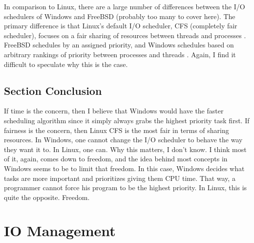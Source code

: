 \documentclass[onecolumn, draftclsnofoot,10pt, compsoc]{IEEEtran}
\begin{document}
\noindent In comparison to Linux, there are a large number of differences between the I/O schedulers of Windows and FreeBSD (probably too many to cover here). The primary difference is that Linux’s default I/O scheduler, CFS (completely fair scheduler), focuses on a fair sharing of resources between threads and processes \cite{Linux}. FreeBSD schedules by an assigned priority, and Windows schedules based on arbitrary rankings of priority between processes and threads \cite{MSWindows1PTCS} \cite{FreeBSD1PTCS}. Again, I find it difficult to speculate why this is the case.\\

\subsection{Section Conclusion}
\noindent If time is the concern, then I believe that Windows would have the faster scheduling algorithm since it simply always grabs the highest priority task first. If fairness is the concern, then Linux CFS is the most fair in terms of sharing resources. In Windows, one cannot change the I/O scheduler to behave the way they want it to. In Linux, one can. Why this matters, I don’t know. I think most of it, again, comes down to freedom, and the idea behind most concepts in Windows seems to be to limit that freedom. In this case, Windows decides what tasks are more important and prioritizes giving them CPU time. That way, a programmer cannot force his program to be the highest priority. In Linux, this is quite the opposite. Freedom.\\

\newpage
\section{IO Management}
\end{document}
